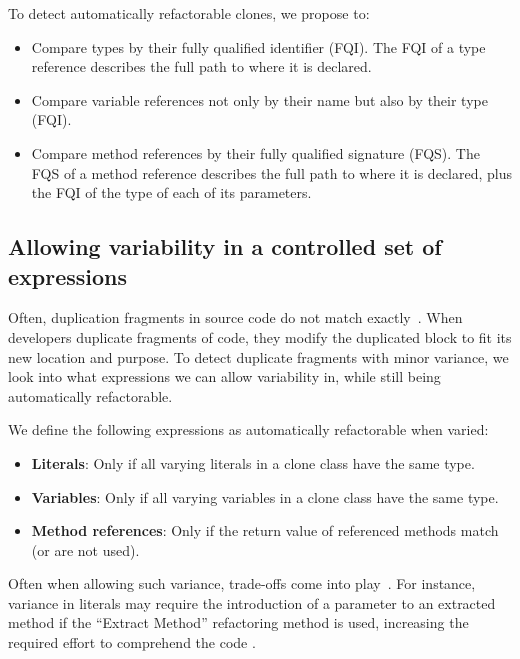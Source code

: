 \documentclass[sigconf,review,anonymous]{acmart}
\begin{document}
To detect automatically refactorable clones, we propose to:
\begin{itemize}
  \item Compare types by their fully qualified identifier (FQI). The FQI of a type reference describes the full path to where it is declared.
  \item Compare variable references not only by their name but also by their type (FQI).
  \item Compare method references by their fully qualified signature (FQS). The FQS of a method reference describes the full path to where it is declared, plus the FQI of the type of each of its parameters.
\end{itemize}

\subsection{Allowing variability in a controlled set of expressions} \label{sec:t2r}
Often, duplication fragments in source code do not match exactly~\cite{kodhai2013method}. When developers duplicate fragments of code, they modify the duplicated block to fit its new location and purpose. To detect duplicate fragments with minor variance, we look into what expressions we can allow variability in, while still being automatically refactorable.

We define the following expressions as automatically refactorable when varied:
\begin{itemize}
  \item \textbf{Literals}: Only if all varying literals in a clone class have the same type.
  \item \textbf{Variables}: Only if all varying variables in a clone class have the same type.
  \item \textbf{Method references}: Only if the return value of referenced methods match (or are not used).
\end{itemize}
Often when allowing such variance, trade-offs come into play~\cite{krishnan2013refactoring, krishnan2014unification}. For instance, variance in literals may require the introduction of a parameter to an extracted method if the ``Extract Method'' refactoring method is used, increasing the required effort to comprehend the code \cite{heitlager2007practical}.
\end{document}
